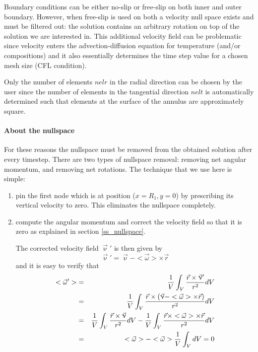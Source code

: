 Boundary conditions can be either no-slip or free-slip on both inner and outer boundary. 
However, when free-slip is used on both a velocity null space exists and must be filtered out:
the solution contains an arbitrary rotation on top of the solution we are interested in.
This additional velocity field can be problematic since velocity enters the advection-diffusion 
equation for temperature (and/or compositions)
and it also essentially determines the time step value for a chosen mesh size (CFL condition).

Only the number of elements $nelr$ in the radial direction can be chosen by the user
since the number of elements in the tangential direction $nelt$ is automatically determined
such that elements at the surface of the annulus are approximately square.

\paragraph{About the nullspace}
For these reasons the nullspace must be removed from the obtained solution after every timestep.
There are two types of nullspace removal: removing net angular momentum, and removing net rotations.
The technique that we use here is simple:
\begin{enumerate}
\item pin the first node which is at position ($x=R_1,y=0$) by prescribing its vertical velocity to zero. This 
eliminates the nullspace completely. 
\item compute the angular momentum and correct the velocity field so that it is zero as explained in section \ref{ss_nullspace}.


The corrected velocity field $\vec{\upnu}'$ is then given by 
\[
\vec{\upnu}' = \vec{\upnu} - <\vec\omega>\times \vec{r}
\]
and it is easy to verify that 
\begin{eqnarray}
<{\vec\omega}'> 
&=& \frac{1}{V} \int_V \frac{{\vec r}\times {\vec\upnu}'}{r^2} dV \nonumber\\
&=& \frac{1}{V} \int_V \frac{{\vec r}\times (\vec{\upnu} - <\vec\omega>\times \vec{r})   }{r^2} dV\nonumber\\
&=& \frac{1}{V} \int_V \frac{{\vec r}\times \vec{\upnu}    }{r^2} dV
- \frac{1}{V} \int_V \frac{{\vec r}\times  <\vec\omega>\times \vec{r}   }{r^2} dV\nonumber\\
&=&  <{\vec\omega}> -  <{\vec\omega}> \frac{1}{V} \int_V dV = 0
\end{eqnarray}

\end{enumerate}



